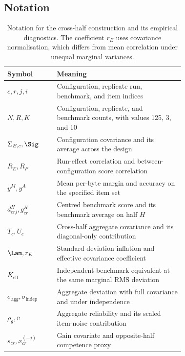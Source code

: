 \subsection{Notation}
\begin{table}[h]
\centering
\caption{Notation for the cross-half construction and its empirical diagnostics. The coefficient $\bar r_E$ uses covariance normalisation, which differs from mean correlation under unequal marginal variances.}
\begin{tabular}{lp{0.72\linewidth}}
\toprule
Symbol & Meaning\\
\midrule
$c,r,j,i$ & Configuration, replicate run, benchmark, and item indices\\
$N,R,K$ & Configuration, replicate, and benchmark counts, with values 125, 3, and 10\\
$\Sigma_{E,c},\Sig$ & Configuration covariance and its average across the design\\
$R_E,R_P$ & Run-effect correlation and between-configuration score correlation\\
$y^M,y^A$ & Mean per-byte margin and accuracy on the specified item set\\
$d^H_{crj},g^H_{cr}$ & Centred benchmark score and its benchmark average on half $H$\\
$T_c,U_c$ & Cross-half aggregate covariance and its diagonal-only contribution\\
$\Lam,\bar r_E$ & Standard-deviation inflation and effective covariance coefficient\\
$K_{\mathrm{eff}}$ & Independent-benchmark equivalent at the same marginal RMS deviation\\
$\sigma_{\mathrm{agg}},\sigma_{\mathrm{indep}}$ & Aggregate deviation with full covariance and under independence\\
$\rho_g,\bar v$ & Aggregate reliability and its scaled item-noise contribution\\
$s_{cr},x_{cr}^{(-j)}$ & Gain covariate and opposite-half competence proxy\\
\bottomrule
\end{tabular}
\end{table}

